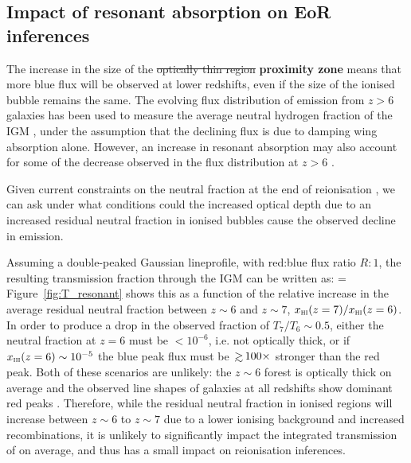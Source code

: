 \documentclass[fleqn,usenatbib]{mnras}
\providecommand{\DIFadd}[1]{{\protect\color{Green} \bf #1}} %
\providecommand{\DIFdel}[1]{{\protect\color{lightgray} \footnotesize \sout{#1}}} %
\providecommand{\DIFaddbegin}{} %
\providecommand{\DIFaddend}{} %
\providecommand{\DIFdelbegin}{} %
\providecommand{\DIFdelend}{} %
\newcommand{\DIFscaledelfig}{0.5}
\newlength{\DIFdelgraphicswidth} %
\newlength{\DIFdelgraphicsheight} %
\newcommand{\DIFaddincludegraphics}[2][]{{\color{blue}\fbox{\DIFOincludegraphics[#1]{#2}}}} %
\newcommand{\DIFdelincludegraphics}[2][]{%
\sbox{\DIFdelgraphicsbox}{\DIFOincludegraphics[#1]{#2}}%
\settoboxwidth{\DIFdelgraphicswidth}{\DIFdelgraphicsbox} %
\settoboxtotalheight{\DIFdelgraphicsheight}{\DIFdelgraphicsbox} %
\scalebox{\DIFscaledelfig}{%
\parbox[b]{\DIFdelgraphicswidth}{\usebox{\DIFdelgraphicsbox}\\[-\baselineskip] \rule{\DIFdelgraphicswidth}{0em}}\llap{\resizebox{\DIFdelgraphicswidth}{\DIFdelgraphicsheight}{%
\setlength{\unitlength}{\DIFdelgraphicswidth}%
\begin{picture}(1,1)%
\thicklines\linethickness{2pt} %
{\color[rgb]{1,0,0}\put(0,0){\framebox(1,1){}}}%
{\color[rgb]{1,0,0}\put(0,0){\line( 1,1){1}}}%
{\color[rgb]{1,0,0}\put(0,1){\line(1,-1){1}}}%
\end{picture}%
}\hspace*{3pt}}} %
} %
\DeclareRobustCommand{\DIFaddbegin}{\DIFOaddbegin \let\includegraphics\DIFaddincludegraphics} %
\DeclareRobustCommand{\DIFaddend}{\DIFOaddend \let\includegraphics\DIFOincludegraphics} %
\DeclareRobustCommand{\DIFdelbegin}{\DIFOdelbegin \let\includegraphics\DIFdelincludegraphics} %
\DeclareRobustCommand{\DIFdelend}{\DIFOaddend \let\includegraphics\DIFOincludegraphics} %
\begin{document}
\DIFaddend %
\subsection{Impact of resonant absorption on EoR inferences}
\label{sec:disc_lyafrac}

The increase in the size of the \DIFdelbegin \DIFdel{optically thin region }\DIFdelend \DIFaddbegin \DIFadd{proximity zone }\DIFaddend means that more blue flux will be observed at lower redshifts, even if the size of the ionised bubble remains the same. The evolving flux distribution of \lya emission from $z>6$ galaxies has been used to measure the average neutral hydrogen fraction of the IGM \citep{Mesinger2015,Mason2018}, under the assumption that the declining flux is due to damping wing absorption alone. However, an increase in resonant absorption may also account for some of the decrease observed in the \lya flux distribution at $z>6$ \citep[see e.g.,][]{Bolton2013a,Mesinger2015}.

Given current constraints on the neutral fraction at the end of reionisation \citep[$z<6$,][]{Fan2006}, we can ask under what conditions could the increased optical depth due to an increased residual neutral fraction in ionised bubbles cause the observed decline in \lya emission.

Assuming a double-peaked Gaussian \lya lineprofile, with red:blue flux ratio $R:1$, the resulting \lya transmission fraction through the IGM can be written as:
%
\BE \label{eqn:T_lya}
 = 
\EE
%
Figure~\ref{fig:T_resonant} shows this as a function of the relative increase in the average residual neutral fraction between $z\sim6$ and $z\sim7$, $\xHI(z=7)/\xHI(z=6)$. In order to produce a drop in the observed \lya fraction of $T_7/T_6 \sim 0.5$, either the neutral fraction at $z=6$ must be $<10^{-6}$, i.e. not optically thick, or if $\xHI(z=6) \sim 10^{-5}$ the blue peak flux must be $\simgt100\times$ stronger than the red peak. Both of these scenarios are unlikely: the $z\sim6$ \lya forest is optically thick on average \citep[e.g,][find $\xHI(z \sim 6) \simgt 10^{-4}$]{Fan2006} and the observed \lya line shapes of galaxies at all redshifts show dominant red peaks \citep[e.g.,][]{Trainor2015,Rivera-Thorsen2015,Yang2017a,Steidel2018}. Therefore, while the residual neutral fraction in ionised regions will increase between $z\sim6$ to $z\sim7$ due to a lower ionising background and increased recombinations, it is unlikely to significantly impact the integrated transmission of \lya on average, and thus has a small impact on reionisation inferences. 
\end{document}
